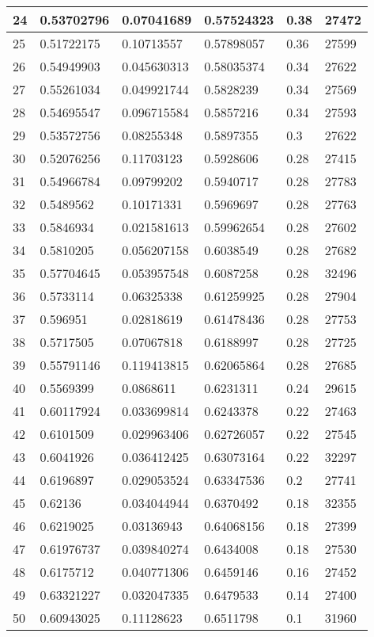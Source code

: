 \begin{longtable}{|l|l|l|l|l|l|}
24 & 0.53702796 & 0.07041689 & 0.57524323 & 0.38 & 27472 \\ \hline 
25 & 0.51722175 & 0.10713557 & 0.57898057 & 0.36 & 27599 \\ \hline 
26 & 0.54949903 & 0.045630313 & 0.58035374 & 0.34 & 27622 \\ \hline 
27 & 0.55261034 & 0.049921744 & 0.5828239 & 0.34 & 27569 \\ \hline 
28 & 0.54695547 & 0.096715584 & 0.5857216 & 0.34 & 27593 \\ \hline 
29 & 0.53572756 & 0.08255348 & 0.5897355 & 0.3 & 27622 \\ \hline 
30 & 0.52076256 & 0.11703123 & 0.5928606 & 0.28 & 27415 \\ \hline 
31 & 0.54966784 & 0.09799202 & 0.5940717 & 0.28 & 27783 \\ \hline 
32 & 0.5489562 & 0.10171331 & 0.5969697 & 0.28 & 27763 \\ \hline 
33 & 0.5846934 & 0.021581613 & 0.59962654 & 0.28 & 27602 \\ \hline 
34 & 0.5810205 & 0.056207158 & 0.6038549 & 0.28 & 27682 \\ \hline 
35 & 0.57704645 & 0.053957548 & 0.6087258 & 0.28 & 32496 \\ \hline 
36 & 0.5733114 & 0.06325338 & 0.61259925 & 0.28 & 27904 \\ \hline 
37 & 0.596951 & 0.02818619 & 0.61478436 & 0.28 & 27753 \\ \hline 
38 & 0.5717505 & 0.07067818 & 0.6188997 & 0.28 & 27725 \\ \hline 
39 & 0.55791146 & 0.119413815 & 0.62065864 & 0.28 & 27685 \\ \hline 
40 & 0.5569399 & 0.0868611 & 0.6231311 & 0.24 & 29615 \\ \hline 
41 & 0.60117924 & 0.033699814 & 0.6243378 & 0.22 & 27463 \\ \hline 
42 & 0.6101509 & 0.029963406 & 0.62726057 & 0.22 & 27545 \\ \hline 
43 & 0.6041926 & 0.036412425 & 0.63073164 & 0.22 & 32297 \\ \hline 
44 & 0.6196897 & 0.029053524 & 0.63347536 & 0.2 & 27741 \\ \hline 
45 & 0.62136 & 0.034044944 & 0.6370492 & 0.18 & 32355 \\ \hline 
46 & 0.6219025 & 0.03136943 & 0.64068156 & 0.18 & 27399 \\ \hline 
47 & 0.61976737 & 0.039840274 & 0.6434008 & 0.18 & 27530 \\ \hline 
48 & 0.6175712 & 0.040771306 & 0.6459146 & 0.16 & 27452 \\ \hline 
49 & 0.63321227 & 0.032047335 & 0.6479533 & 0.14 & 27400 \\ \hline 
50 & 0.60943025 & 0.11128623 & 0.6511798 & 0.1 & 31960 \\ \hline 
\end{longtable}
